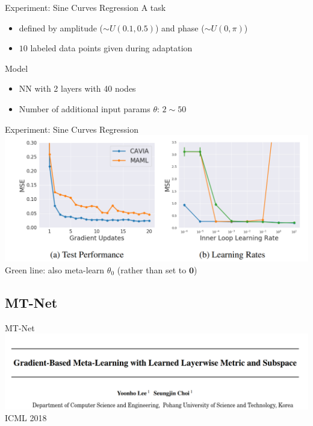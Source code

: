 \documentclass{beamer}
\begin{document}
\begin{frame}{Experiment: Sine Curves Regression}
  A task 
  \begin{itemize}
    \item defined by amplitude ($\sim U(0.1,0.5)$) and phase ($\sim U(0, \pi)$)
    \item $10$ labeled data points given during adaptation
  \end{itemize}
  Model
  \begin{itemize}
    \item NN with 2 layers with 40 nodes
    \item Number of additional input params $\theta$: $2 \sim 50$
  \end{itemize}
\end{frame}

\begin{frame}{Experiment: Sine Curves Regression}
  \center \includegraphics[width=1.0\textwidth]{fig/caml-sine-result.png}
  Green line: also meta-learn $\theta_0$ (rather than set to $\mathbf{0}$)  
\end{frame}

\subsection{MT-Net}
\begin{frame}{MT-Net}
  \includegraphics[width=\textwidth]{fig/title.png}
  \center ICML 2018
\end{frame}
\end{document}

